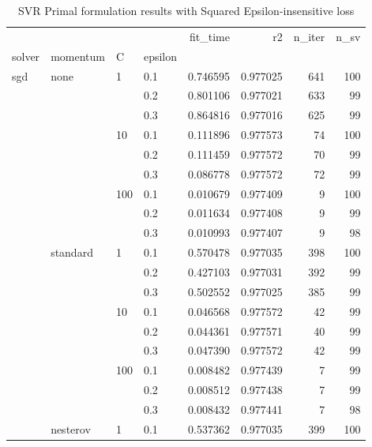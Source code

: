 \begin{table}[H]
\centering
\caption{SVR Primal formulation results with Squared Epsilon-insensitive loss}
\label{primal_svr_squared_eps_cv_results}
\begin{tabular}{llllrrrr}
\toprule
          &   &     &     &  fit\_time &        r2 &  n\_iter &  n\_sv \\
solver & momentum & C & epsilon &           &           &         &       \\
\midrule
sgd & none & 1   & 0.1 &  0.746595 &  0.977025 &     641 &   100 \\
          &   &     & 0.2 &  0.801106 &  0.977021 &     633 &    99 \\
          &   &     & 0.3 &  0.864816 &  0.977016 &     625 &    99 \\
          &   & 10  & 0.1 &  0.111896 &  0.977573 &      74 &   100 \\
          &   &     & 0.2 &  0.111459 &  0.977572 &      70 &    99 \\
          &   &     & 0.3 &  0.086778 &  0.977572 &      72 &    99 \\
          &   & 100 & 0.1 &  0.010679 &  0.977409 &       9 &   100 \\
          &   &     & 0.2 &  0.011634 &  0.977408 &       9 &    99 \\
          &   &     & 0.3 &  0.010993 &  0.977407 &       9 &    98 \\
          & standard & 1   & 0.1 &  0.570478 &  0.977035 &     398 &   100 \\
          &   &     & 0.2 &  0.427103 &  0.977031 &     392 &    99 \\
          &   &     & 0.3 &  0.502552 &  0.977025 &     385 &    99 \\
          &   & 10  & 0.1 &  0.046568 &  0.977572 &      42 &    99 \\
          &   &     & 0.2 &  0.044361 &  0.977571 &      40 &    99 \\
          &   &     & 0.3 &  0.047390 &  0.977572 &      42 &    99 \\
          &   & 100 & 0.1 &  0.008482 &  0.977439 &       7 &    99 \\
          &   &     & 0.2 &  0.008512 &  0.977438 &       7 &    99 \\
          &   &     & 0.3 &  0.008432 &  0.977441 &       7 &    98 \\
          & nesterov & 1   & 0.1 &  0.537362 &  0.977035 &     399 &   100 \\

\end{tabular}
\end{table}
